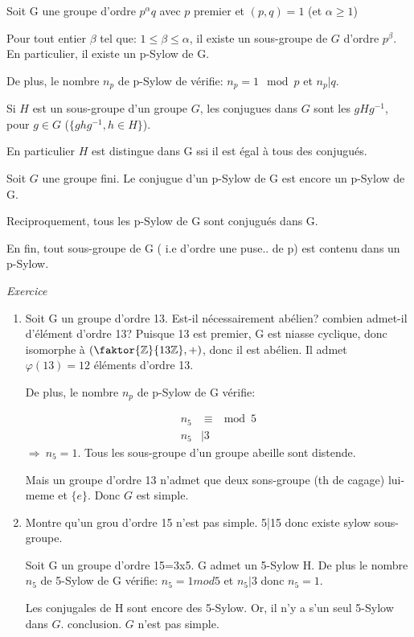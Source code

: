 \begin{theorem} Soit G une groupe d'ordre $p^\alpha q$ avec $p$ premier et $(p, q)= 1$ (et $\alpha \geq 1$)

Pour tout entier $\beta$ tel que: $1\leq \beta \leq \alpha$, il existe un sous-groupe de $G$ d'ordre $p^\beta$. En particulier, il existe un p-Sylow de G.

De plus, le nombre $n_p$ de p-Sylow de vérifie:
$n_p = 1 \mod p$ et $n_p | q$.

\end{theorem}

\begin{definition}
	Si $H$ est un sous-groupe d'un groupe $G$, les conjugues dans $G$ sont les $gHg^{-1}$, pour $g\in G$ ($\{ghg^{-1}, h\in H\}$).
\end{definition}

En particulier $H$ est distingue dans G ssi il est égal à tous des conjugués.

\begin{theorem}
Soit $G$ une groupe fini.
Le conjugue d'un p-Sylow de G est encore un p-Sylow de G.

Reciproquement, tous les p-Sylow de G sont conjugués dans G.

En fin, tout sous-groupe de G ( i.e d'ordre une puse.. de p) est contenu dans un p-Sylow.
\end{theorem}

\emph{Exercice}
\begin{enumerate}
	\item Soit G un groupe d'ordre 13. Est-il nécessairement abélien? combien admet-il d'élément d'ordre 13?
	Puisque 13 est premier, G est niasse cyclique, donc isomorphe à $(\faktor{\mathbb{Z}}{13\mathbb{Z}},+)$, donc il est abélien. Il admet $\varphi(13)=12$ éléments d'ordre 13.
	
	De plus, le nombre $n_p$ de p-Sylow de G vérifie:
	
	\begin{align*}
		n_5  &\equiv  \mod 5\\ n_5 &| 3
	\end{align*}
	$\Rightarrow\ n_5 = 1$.
	Tous les sous-groupe d'un groupe abeille sont distende.
	
	Mais un groupe d'ordre 13 n'admet que deux sons-groupe (th de cagage) lui-meme et $\{e\}$. Donc $G$ est simple.
	\item Montre qu'un grou d'ordre 15 n'est pas simple. 5|15 donc existe sylow sous-groupe. 
	
	Soit G un groupe d'ordre 15=3x5. G admet un 5-Sylow H. De plus le nombre $n_5$ de 5-Sylow de G vérifie: $n_5=1 mod 5$ et $n_5 | 3$ donc $n_5=1$.
	
	Les conjugales de H sont encore des 5-Sylow. Or, il n'y a s'un seul 5-Sylow dans $G$. conclusion. $G$ n'est pas simple.
\end{enumerate}


